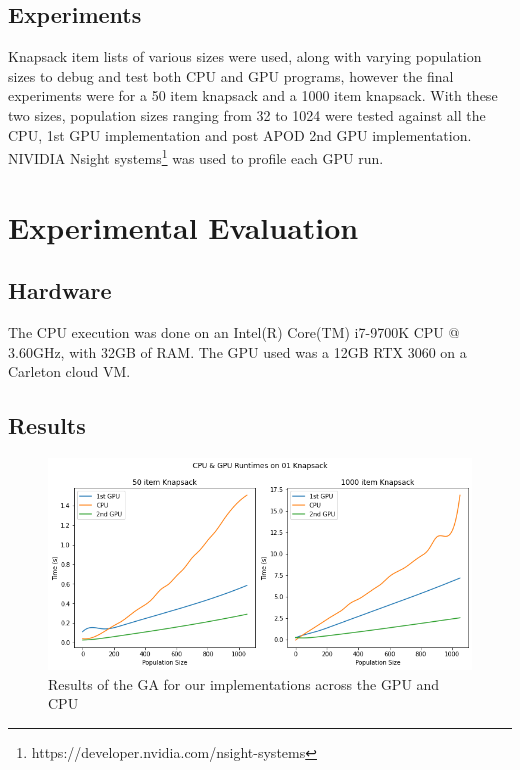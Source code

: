 \documentclass[11pt]{article}       %
\begin{document}
\subsection{Experiments}
Knapsack item lists of various sizes were used, along with varying population sizes to debug and test both CPU and GPU programs, however the final experiments were for a 50 item knapsack and a 1000 item knapsack. With these two sizes, population sizes ranging from 32 to 1024 were tested against all the CPU, 1st GPU implementation and post APOD 2nd GPU implementation.
NIVIDIA Nsight systems\footnote{https://developer.nvidia.com/nsight-systems} was used to profile each GPU run.

\section{Experimental Evaluation} \label{expeval}

\subsection{Hardware}
The CPU execution was done on an Intel(R) Core(TM) i7-9700K CPU @ 3.60GHz, with 32GB of RAM. The GPU used was a 12GB RTX 3060 on a Carleton cloud VM.

\subsection{Results}
\begin{figure}[h]
    \centering
    \includegraphics[width=\linewidth]{Figures/cpu_gpu_runtimes.png}
    \caption{Results of the GA for our implementations across the GPU and CPU}
    \label{fig:runtime}
\end{figure}
\end{document}
